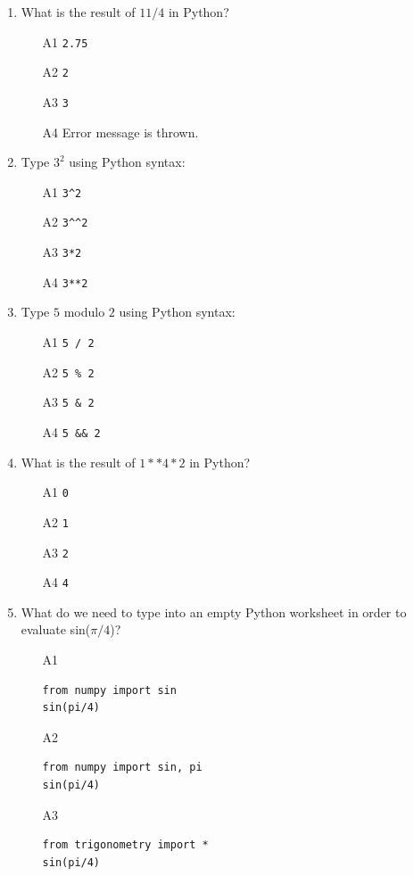 \documentclass[article,A4,12pt]{llncs}
\begin{document}
\begin{enumerate}
\item What is the result of $11 / 4$ in Python?
\begin{enumerate}
\item[A1] {\tt 2.75}
\item[A2] {\tt 2}
\item[A3] {\tt 3}
\item[A4] Error message is thrown.
\end{enumerate}
\item Type $3^2$ using Python syntax:
\begin{enumerate}
\item[A1] {\tt 3\^{}2}
\item[A2] {\tt 3\^{}\^{}2}
\item[A3] {\tt 3*2}
\item[A4] {\tt 3**2}
\end{enumerate}
\item Type $5$ modulo $2$ using Python syntax:
\begin{enumerate}
\item[A1] {\tt 5 / 2}
\item[A2] {\tt 5 \% 2}
\item[A3] {\tt 5 \& 2}
\item[A4] {\tt 5 \&\& 2}
\end{enumerate}
\item What is the result of $1**4*2$ in Python?
\begin{enumerate}
\item[A1] {\tt 0}
\item[A2] {\tt 1}
\item[A3] {\tt 2}
\item[A4] {\tt 4}
\end{enumerate}
\item What do we need to type into an empty Python worksheet in order to evaluate sin($\pi/4$)?
\begin{enumerate}
\item[A1] 
\begin{verbatim}
from numpy import sin
sin(pi/4)
\end{verbatim}
\item[A2] 
\begin{verbatim}
from numpy import sin, pi
sin(pi/4)
\end{verbatim}
\item[A3] 
\begin{verbatim}
from trigonometry import *
sin(pi/4)
\end{verbatim}

\end{enumerate}
\end{enumerate}
\end{document}
